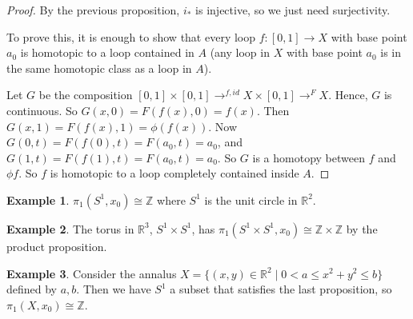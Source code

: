 \documentclass{article}
\theoremstyle{definition}
\newtheorem{exmp}{Example}[section]
\theoremstyle{plain}%
\theoremstyle{remark}
\newcommand{\R}{\mathbb{R}}
\newcommand{\Z}{\mathbb{Z}}
\begin{document}
\begin{proof}
     By the previous proposition, $i_*$ is injective, so we just need surjectivity.
     
     To prove this, it is enough to show that every loop $f : [0,1] \to X$ with base point $a_0$ is homotopic to a loop contained in $A$ (any loop in $X$ with base point $a_0$ is in the same homotopic class as a loop in $A$).
     
     Let $G$ be the composition $[0,1] \times [0,1] \to^{f, id} X \times [0,1] \to^F X$. Hence, $G$ is continuous. So $G(x,0) = F(f(x), 0) = f(x)$. Then $G(x,1) = F(f(x), 1) = \phi(f(x))$. Now $G(0,t) = F(f(0), t)  = F(a_0, t) = a_0$, and $G(1,t) = F(f(1), t) = F(a_0,t) = a_0$. So $G$ is a homotopy between $f$ and $\phi f$. So $f$ is homotopic to a loop completely contained inside $A$.
\end{proof}

\begin{exmp}
    $\pi_1(S^1, x_0) \cong \Z$ where $S^1$ is the unit circle in $\R^2$.
\end{exmp}

\begin{exmp}
    The torus in $\R^3$, $S^1 \times S^1$, has $\pi_1(S^1 \times S^1, x_0) \cong \Z \times \Z$ by the product proposition.
\end{exmp}

\begin{exmp}
    Consider the annalus $X = \{(x,y) \in \R^2 \; | \; 0 < a \le x^2 + y^2 \le b\}$ defined by $a,b$. Then we have $S^1$ a subset that satisfies the last proposition, so $\pi_1(X, x_0) \cong \Z$.
\end{exmp}
\end{document}
